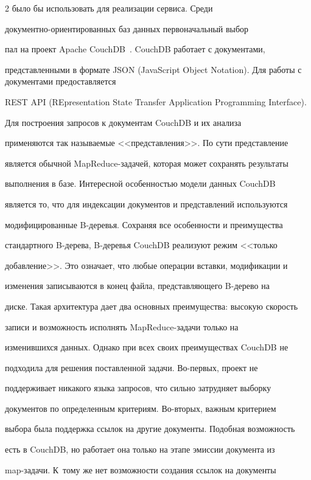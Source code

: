 \begin{multicols}{2}
было бы использовать для реализации сервиса. Среди 


   до\-ку\-мент\-но-ориен\-ти\-ро\-ван\-ных баз данных первоначальный выбор 


пал на проект Apache CouchDB~\cite{8-kli}. CouchDB работает с документами, 


представленными в формате JSON (JavaScript Object Notation). Для работы с документами предоставляется 


REST API (REpresentation State Transfer Application Programming Interface). 


Для построения запросов к документам CouchDB и их анализа 


применяются так называемые <<представления>>. По сути представление 


является обычной MapReduce-за\-да\-чей, которая может сохранять результаты 


выполнения в базе. Интересной особенностью модели данных CouchDB 


является то, что для индексации документов и представлений используются 


модифицированные B-де\-ревья. Сохраняя все особенности и преимущества 


стандартного B-де\-ре\-ва, B-де\-ревья CouchDB реализуют режим <<только 


добавление>>. Это означает, что любые операции вставки, модификации и 


изменения записываются в конец файла, представляющего B-де\-ре\-во на 


диске. Такая архитектура дает два основных преимущества: высокую ско\-рость 


записи и возможность исполнять MapReduce-за\-да\-чи только на 


изменившихся данных. Однако при всех своих преимуществах CouchDB не 


подходила для решения поставленной задачи. Во-пер\-вых, проект не 


поддерживает никакого языка запросов, что сильно затрудняет выборку 


документов по определенным критериям. Во-вто\-рых, важным критерием 


выбора была поддержка ссылок на другие документы. Подобная возможность 


есть в CouchDB, но работает она только на этапе эмиссии документа из 


   map-за\-да\-чи. К~тому же нет возможности создания ссылок на документы 



\end{multicols}
